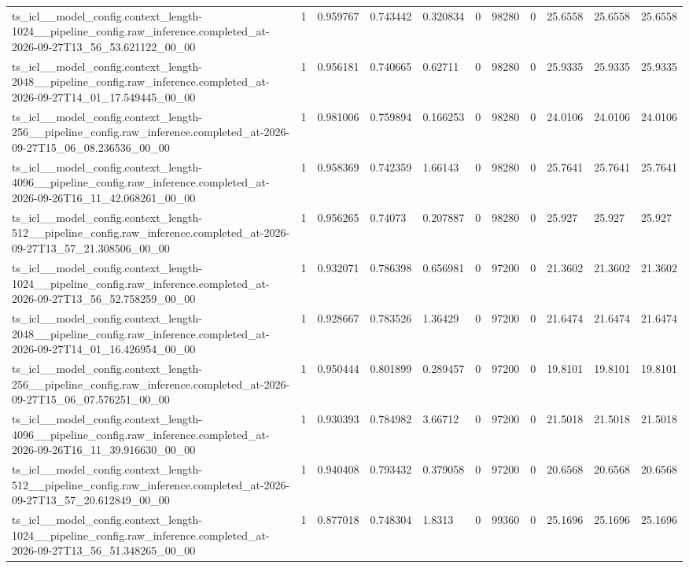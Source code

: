 \begin{tabular}{lllllllllll}
ts\_icl\_\_model\_config.context\_length-1024\_\_pipeline\_config.raw\_inference.completed\_at-2026-09-27T13\_56\_53.621122\_00\_00 & 1 & 0.959767 & 0.743442 & 0.320834 & 0 & 98280 & 0 & 25.6558 & 25.6558 & 25.6558 \\
ts\_icl\_\_model\_config.context\_length-2048\_\_pipeline\_config.raw\_inference.completed\_at-2026-09-27T14\_01\_17.549445\_00\_00 & 1 & 0.956181 & 0.740665 & 0.62711 & 0 & 98280 & 0 & 25.9335 & 25.9335 & 25.9335 \\
ts\_icl\_\_model\_config.context\_length-256\_\_pipeline\_config.raw\_inference.completed\_at-2026-09-27T15\_06\_08.236536\_00\_00 & 1 & 0.981006 & 0.759894 & 0.166253 & 0 & 98280 & 0 & 24.0106 & 24.0106 & 24.0106 \\
ts\_icl\_\_model\_config.context\_length-4096\_\_pipeline\_config.raw\_inference.completed\_at-2026-09-26T16\_11\_42.068261\_00\_00 & 1 & 0.958369 & 0.742359 & 1.66143 & 0 & 98280 & 0 & 25.7641 & 25.7641 & 25.7641 \\
ts\_icl\_\_model\_config.context\_length-512\_\_pipeline\_config.raw\_inference.completed\_at-2026-09-27T13\_57\_21.308506\_00\_00 & 1 & 0.956265 & 0.74073 & 0.207887 & 0 & 98280 & 0 & 25.927 & 25.927 & 25.927 \\
ts\_icl\_\_model\_config.context\_length-1024\_\_pipeline\_config.raw\_inference.completed\_at-2026-09-27T13\_56\_52.758259\_00\_00 & 1 & 0.932071 & 0.786398 & 0.656981 & 0 & 97200 & 0 & 21.3602 & 21.3602 & 21.3602 \\
ts\_icl\_\_model\_config.context\_length-2048\_\_pipeline\_config.raw\_inference.completed\_at-2026-09-27T14\_01\_16.426954\_00\_00 & 1 & 0.928667 & 0.783526 & 1.36429 & 0 & 97200 & 0 & 21.6474 & 21.6474 & 21.6474 \\
ts\_icl\_\_model\_config.context\_length-256\_\_pipeline\_config.raw\_inference.completed\_at-2026-09-27T15\_06\_07.576251\_00\_00 & 1 & 0.950444 & 0.801899 & 0.289457 & 0 & 97200 & 0 & 19.8101 & 19.8101 & 19.8101 \\
ts\_icl\_\_model\_config.context\_length-4096\_\_pipeline\_config.raw\_inference.completed\_at-2026-09-26T16\_11\_39.916630\_00\_00 & 1 & 0.930393 & 0.784982 & 3.66712 & 0 & 97200 & 0 & 21.5018 & 21.5018 & 21.5018 \\
ts\_icl\_\_model\_config.context\_length-512\_\_pipeline\_config.raw\_inference.completed\_at-2026-09-27T13\_57\_20.612849\_00\_00 & 1 & 0.940408 & 0.793432 & 0.379058 & 0 & 97200 & 0 & 20.6568 & 20.6568 & 20.6568 \\
ts\_icl\_\_model\_config.context\_length-1024\_\_pipeline\_config.raw\_inference.completed\_at-2026-09-27T13\_56\_51.348265\_00\_00 & 1 & 0.877018 & 0.748304 & 1.8313 & 0 & 99360 & 0 & 25.1696 & 25.1696 & 25.1696 \\

\end{tabular}
